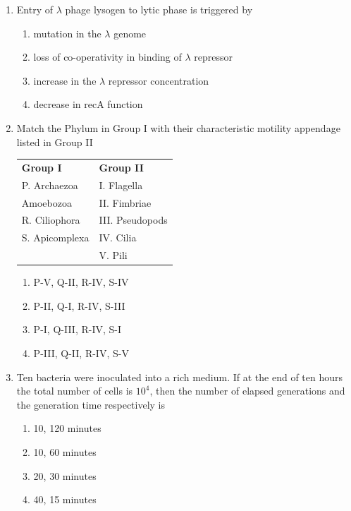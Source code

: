 \documentclass[journal,12pt,onecolumn]{IEEEtran}
\begin{document}
\begin{enumerate}[label=\arabic*.]
\item Entry of $\lambda$ phage lysogen to lytic phase is triggered by
\begin{enumerate}[label=(\Alph*)]
\item mutation in the $\lambda$ genome
\item loss of co-operativity in binding of $\lambda$ repressor
\item increase in the $\lambda$ repressor concentration
\item decrease in recA function
\end{enumerate}

\item Match the Phylum in Group I with their characteristic motility appendage listed in Group II
\begin{center}
\begin{tabular}{p{6cm}p{6cm}}
\textbf{Group I} & \textbf{Group II}\\
P. Archaezoa & I. Flagella \\
 Amoebozoa & II. Fimbriae \\
R. Ciliophora & III. Pseudopods \\
S. Apicomplexa & IV. Cilia \\
& V. Pili \\
\end{tabular}
\end{center}
\begin{multicols}{2}
\begin{enumerate}[label=(\Alph*)]
\item P-V, Q-II, R-IV, S-IV
\item P-II, Q-I, R-IV, S-III
\item P-I, Q-III, R-IV, S-I
\item P-III, Q-II, R-IV, S-V
\end{enumerate}
\end{multicols}

\item Ten bacteria were inoculated into a rich medium. If at the end of ten hours the total number of cells is $10^4$, then the number of elapsed generations and the generation time respectively is
\begin{multicols}{2}
\begin{enumerate}[label=(\Alph*)]
\item 10, 120 minutes
\item 10, 60 minutes
\item 20, 30 minutes
\item 40, 15 minutes
\end{enumerate}
\end{multicols}


\end{enumerate}
\end{document}
